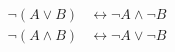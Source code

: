 \documentclass[preview]{standalone}
\begin{document}
   \begin{align*}
     \neg (A \vee B) & \leftrightarrow \neg A \wedge \neg B \\
     \neg (A \wedge B) & \leftrightarrow \neg A \vee \neg B 
   \end{align*}
\end{document}
